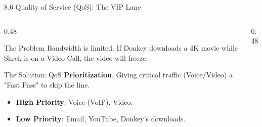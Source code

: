 \documentclass[aspectratio=169]{beamer}  %
\begin{document}
\begin{frame}{8.6 Quality of Service (QoS): The VIP Lane}
    \begin{columns}[T]
        \begin{column}{0.48\textwidth}
            \begin{block}{The Problem}
                \footnotesize
                Bandwidth is limited. If Donkey downloads a 4K movie while Shrek is on a Video Call, the video will freeze.
            \end{block}
            \begin{alertblock}{The Solution: QoS}
                \footnotesize
                \textbf{Prioritization}. Giving critical traffic (Voice/Video) a "Fast Pass" to skip the line.
                \begin{itemize}
                    \item \textbf{High Priority}: Voice (VoIP), Video.
                    \item \textbf{Low Priority}: Email, YouTube, Donkey's downloads.
                \end{itemize}
            \end{alertblock}
        \end{column}
        \begin{column}{0.48\textwidth}
            \begin{center}
            \end{center}
        \end{column}
    \end{columns}
\end{frame}
\end{document}
